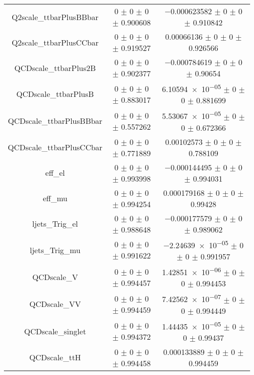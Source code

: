 \begin{table}
\begin{tabular}{ccc}
Q2scale\_ttbarPlusBBbar & \num{0} $\pm$ \num{0} $\pm$ \num{0} $\pm$ \num{0.900608} & \num{-0.000623582} $\pm$ \num{0} $\pm$ \num{0} $\pm$ \num{0.910842}\\
Q2scale\_ttbarPlusCCbar & \num{0} $\pm$ \num{0} $\pm$ \num{0} $\pm$ \num{0.919527} & \num{0.00066136} $\pm$ \num{0} $\pm$ \num{0} $\pm$ \num{0.926566}\\
QCDscale\_ttbarPlus2B & \num{0} $\pm$ \num{0} $\pm$ \num{0} $\pm$ \num{0.902377} & \num{-0.000784619} $\pm$ \num{0} $\pm$ \num{0} $\pm$ \num{0.90654}\\
QCDscale\_ttbarPlusB & \num{0} $\pm$ \num{0} $\pm$ \num{0} $\pm$ \num{0.883017} & \num{6.10594e-05} $\pm$ \num{0} $\pm$ \num{0} $\pm$ \num{0.881699}\\
QCDscale\_ttbarPlusBBbar & \num{0} $\pm$ \num{0} $\pm$ \num{0} $\pm$ \num{0.557262} & \num{5.53067e-05} $\pm$ \num{0} $\pm$ \num{0} $\pm$ \num{0.672366}\\
QCDscale\_ttbarPlusCCbar & \num{0} $\pm$ \num{0} $\pm$ \num{0} $\pm$ \num{0.771889} & \num{0.00102573} $\pm$ \num{0} $\pm$ \num{0} $\pm$ \num{0.788109}\\
eff\_el & \num{0} $\pm$ \num{0} $\pm$ \num{0} $\pm$ \num{0.993998} & \num{-0.000144495} $\pm$ \num{0} $\pm$ \num{0} $\pm$ \num{0.994031}\\
eff\_mu & \num{0} $\pm$ \num{0} $\pm$ \num{0} $\pm$ \num{0.994254} & \num{0.000179168} $\pm$ \num{0} $\pm$ \num{0} $\pm$ \num{0.99428}\\
ljets\_Trig\_el & \num{0} $\pm$ \num{0} $\pm$ \num{0} $\pm$ \num{0.988648} & \num{-0.000177579} $\pm$ \num{0} $\pm$ \num{0} $\pm$ \num{0.989062}\\
ljets\_Trig\_mu & \num{0} $\pm$ \num{0} $\pm$ \num{0} $\pm$ \num{0.991622} & \num{-2.24639e-05} $\pm$ \num{0} $\pm$ \num{0} $\pm$ \num{0.991957}\\
QCDscale\_V & \num{0} $\pm$ \num{0} $\pm$ \num{0} $\pm$ \num{0.994457} & \num{1.42851e-06} $\pm$ \num{0} $\pm$ \num{0} $\pm$ \num{0.994453}\\
QCDscale\_VV & \num{0} $\pm$ \num{0} $\pm$ \num{0} $\pm$ \num{0.994459} & \num{7.42562e-07} $\pm$ \num{0} $\pm$ \num{0} $\pm$ \num{0.994449}\\
QCDscale\_singlet & \num{0} $\pm$ \num{0} $\pm$ \num{0} $\pm$ \num{0.994372} & \num{1.44435e-05} $\pm$ \num{0} $\pm$ \num{0} $\pm$ \num{0.99437}\\
QCDscale\_ttH & \num{0} $\pm$ \num{0} $\pm$ \num{0} $\pm$ \num{0.994458} & \num{0.000133889} $\pm$ \num{0} $\pm$ \num{0} $\pm$ \num{0.994459}\\

\end{tabular}
\end{table}
